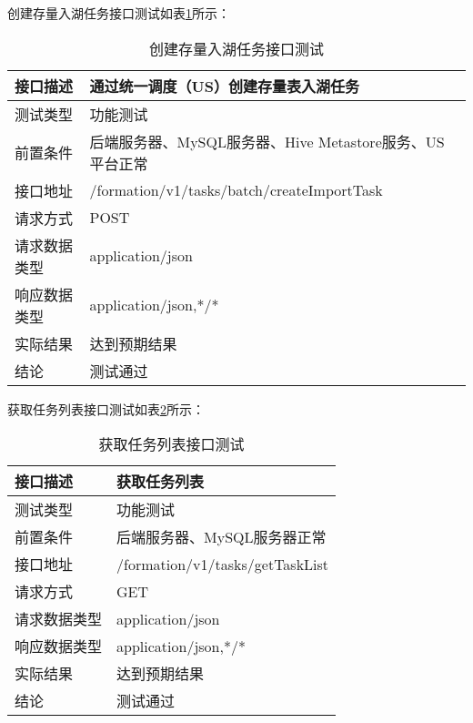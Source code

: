 创建存量入湖任务接口测试如表\ref{tab:exampletable10}所示：

\begin{table}[H]
  \centering
  \caption{创建存量入湖任务接口测试}
  \label{tab:exampletable10}
  \begin{tabular}{ll}
    \toprule
    接口描述         & 通过统一调度（US）创建存量表入湖任务         \\
    \midrule
    测试类型         & 功能测试         \\
    前置条件         & 后端服务器、MySQL服务器、Hive Metastore服务、US平台正常         \\
    接口地址       & /formation/v1/tasks/batch/createImportTask        \\
    请求方式         & POST      \\
    请求数据类型         & application/json     \\
    响应数据类型         & application/json,*/*           \\
    实际结果         & 达到预期结果           \\
    结论            & 测试通过           \\
    \bottomrule
  \end{tabular}
\end{table}

获取任务列表接口测试如表\ref{tab:exampletable11}所示：

\begin{table}[H]
  \centering
  \caption{获取任务列表接口测试}
  \label{tab:exampletable11}
  \begin{tabular}{ll}
    \toprule
    接口描述         & 获取任务列表         \\
    \midrule
    测试类型         & 功能测试         \\
    前置条件         & 后端服务器、MySQL服务器正常         \\
    接口地址       & /formation/v1/tasks/getTaskList        \\
    请求方式         & GET      \\
    请求数据类型         & application/json     \\
    响应数据类型         & application/json,*/*           \\
    实际结果         & 达到预期结果           \\
    结论            & 测试通过           \\
    \bottomrule
  \end{tabular}
\end{table}

